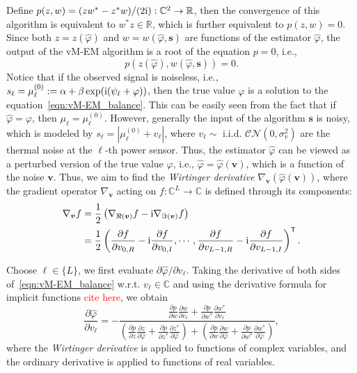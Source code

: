 \documentclass[a4paper,12pt]{article}
\def \T {^{\mathsf{T}}}
\def \ri {{\rm i}}
\newcommand{\red}[1]{\textcolor{red}{#1}}
\begin{document}
Define $p(z,w) = (zw^* - z^*w)/(2\ri): \mathbb{C}^2 \to \mathbb{R}$, then the convergence of this algorithm is equivalent to $w^*z\in\mathbb{R}$, which is further equivalent to $p(z,w)=0$. Since both $z=z(\hat{\varphi})$ and $w=w(\hat{\varphi}, {\bm s})$ are functions of the estimator $\hat{\varphi}$, the output of the vM-EM algorithm is a root of the equation $p=0$, i.e.,  
\begin{equation}
    p(z(\hat{\varphi}),w(\hat{\varphi}, {\bm s}))=0 .
    \label{eqn:vM-EM_balance}
\end{equation}
Notice that if the observed signal is noiseless, i.e., $s_\ell = \mu_\ell^{(0)}:=\alpha+\beta\exp(\ri(\psi_\ell+\varphi))$, then the true value $\varphi$ is a solution to the equation~\eqref{eqn:vM-EM_balance}. This can be easily seen from the fact that if $\hat{\varphi} = \varphi$, then $\mu_\ell = \mu_\ell^{(0)}$.
However, generally the input of the algorithm ${\bm s}$ is noisy, which is modeled by $s_\ell = |\mu_\ell^{(0)} + v_\ell|$, where $v_\ell \sim$ i.i.d. $\mathcal{CN}(0, \sigma_v^2)$ are the thermal noise at the $\ell$-th power sensor. Thus, the estimator $\hat\varphi$ can be viewed as a perturbed version of the true value $\varphi$, i.e., $\hat{\varphi} = \hat{\varphi}(\bm v)$, which is a function of the noise $\bm v$. 
Thus, we aim to find the {\it Wirtinger derivative} $\nabla_{\bm v}(\hat{\varphi}({\bm v}))$, where the gradient operator $\nabla_{{\bm v}}$ acting on $f: \mathbb{C}^L\to \mathbb{C}$ is defined through its components:
\begin{equation}
    \begin{aligned}
    \nabla_{\bm v}f &= \frac{1}{2}\left( \nabla_{\Re({\bm v})} f -\ri \nabla_{\Im({\bm v})} f \right) \\
    &={\frac{1}{2}} \left( \frac{\partial f}{\partial v_{0, R}} -\ri \frac{\partial f}{\partial v_{0, I}}, \cdots,  \frac{\partial f}{\partial v_{L-1, R}} -\ri \frac{\partial f}{\partial v_{L-1, I}}\right)\T. 
    \end{aligned}
\end{equation}

Choose $\ell\in\{L\}$, we first evaluate $\partial \hat{\varphi}/\partial v_\ell$. Taking the derivative of both sides of~\eqref{eqn:vM-EM_balance} w.r.t. $v_\ell\in\mathbb{C}$ and using the derivative formula for implicit functions \red{cite here}, we obtain 
\begin{equation}
    \frac{\partial \hat\varphi}{\partial v_\ell}=-\frac{\frac{\partial p}{\partial w} \frac{\partial w}{\partial v_\ell}+\frac{\partial p}{\partial w^*} \frac{\partial w^*}{\partial v_\ell}}{\left(\frac{\partial p}{\partial z} \frac{\partial z}{\partial \hat\varphi}+\frac{\partial p}{\partial z^*} \frac{\partial z^*}{\partial \hat\varphi}\right)+\left(\frac{\partial p}{\partial w} \frac{\partial w}{\partial \hat\varphi}+\frac{\partial p}{\partial w^*} \frac{\partial w^*}{\partial \hat\varphi}\right)},
    \label{eqn:implicit_function_derivative} 
\end{equation}
where the {\it Wirtinger derivative} is applied to functions of complex variables, and the ordinary derivative is applied to functions of real variables. 
\end{document}

